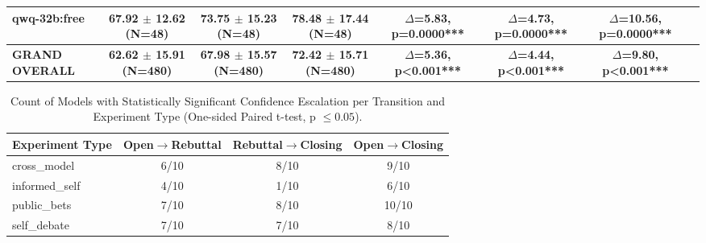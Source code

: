 \documentclass{article}
\begin{document}
\begin{table}[htbp]
{\begin{tabular}{lccccccc}
    qwq-32b:free & 67.92 $\pm$ 12.62 (N=48) & 73.75 $\pm$ 15.23 (N=48) & 78.48 $\pm$ 17.44 (N=48) & $\Delta$=5.83, p=0.0000*** & $\Delta$=4.73, p=0.0000*** & $\Delta$=10.56, p=0.0000*** \\
    \midrule
    \textbf{GRAND OVERALL} & \textbf{62.62 $\pm$ 15.91 (N=480)} & \textbf{67.98 $\pm$ 15.57 (N=480)} & \textbf{72.42 $\pm$ 15.71 (N=480)} & \textbf{$\Delta$=5.36, p<0.001***} & \textbf{$\Delta$=4.44, p<0.001***} & \textbf{$\Delta$=9.80, p<0.001***} \\
    \bottomrule
  \end{tabular}
  }
\end{table}


\begin{table}[htbp]
  \centering
  \caption{Count of Models with Statistically Significant Confidence Escalation per Transition and Experiment Type (One-sided Paired t-test, p $\leq 0.05$).}
  \label{tab:sig_escalation_summary}
  \begin{tabular}{lccc}
    \toprule
    \textbf{Experiment Type} & \textbf{Open$\rightarrow$Rebuttal} & \textbf{Rebuttal$\rightarrow$Closing} & \textbf{Open$\rightarrow$Closing} \\
    \midrule
    cross\_model    & 6/10 & 8/10 & 9/10 \\
    informed\_self  & 4/10 & 1/10 & 6/10 \\
    public\_bets    & 7/10 & 8/10 & 10/10 \\
    self\_debate    & 7/10 & 7/10 & 8/10 \\
    \bottomrule
  \end{tabular}
\end{table}







\end{document}
